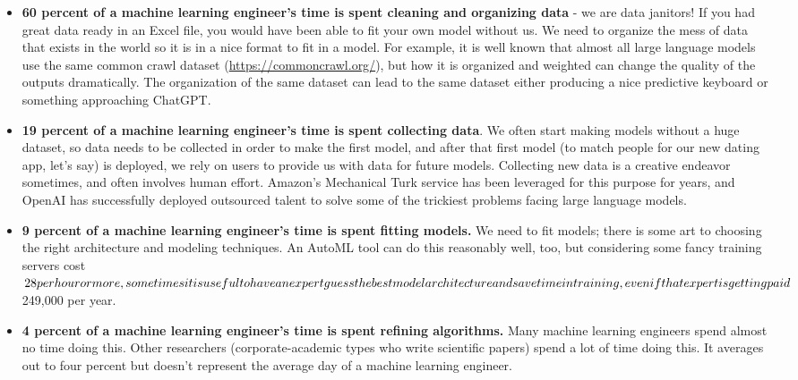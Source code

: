 \begin{itemize}
    \item \textbf{60 percent of a machine learning engineer's time is spent cleaning and organizing data} - we are data janitors! If you had great data ready in an Excel file, you would have been able to fit your own model without us. We need to organize the mess of data that exists in the world so it is in a nice format to fit in a model. For example, it is well known that almost all large language models use the same common crawl dataset (\url{https://commoncrawl.org/}), but how it is organized and weighted can change the quality of the outputs dramatically. The organization of the same dataset can lead to the same dataset either producing a nice predictive keyboard or something approaching ChatGPT.
    \item \textbf{19 percent of a machine learning engineer's time is spent collecting data}. We often start making models without a huge dataset, so data needs to be collected in order to make the first model, and after that first model (to match people for our new dating app, let’s say) is deployed, we rely on users to provide us with data for future models. Collecting new data is a creative endeavor sometimes, and often involves human effort. Amazon’s Mechanical Turk service has been leveraged for this purpose for years, and OpenAI has successfully deployed outsourced talent to solve some of the trickiest problems facing large language models.
    \item \textbf{9 percent of a machine learning engineer's time is spent fitting models.} We need to fit models; there is some art to choosing the right architecture and modeling techniques. An AutoML tool can do this reasonably well, too, but considering some fancy training servers cost $28 per hour or more\sidenote{See the latest pricing from AWS here \url{https://aws.amazon.com/sagemaker/pricing/}}, sometimes it is useful to have an expert guess the best model architecture and save time in training, even if that expert is getting paid $249,000 per year.
    \item \textbf{4 percent of a machine learning engineer's time is spent refining algorithms.} Many machine learning engineers spend almost no time doing this. Other researchers (corporate-academic types who write scientific papers) spend a lot of time doing this. It averages out to four percent but doesn’t represent the average day of a machine learning engineer.
\end{itemize}


